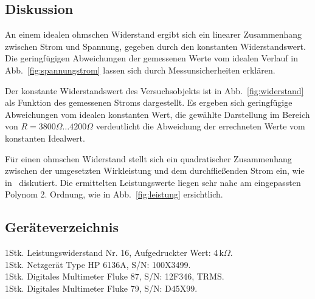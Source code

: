 \documentclass[12pt,a4paper,ngerman]{article}
\begin{document}



\subsection{Diskussion}
%
An einem idealen ohmschen Widerstand ergibt sich ein linearer Zusammenhang
zwischen Strom und Spannung, gegeben durch den konstanten Widerstandswert.
Die geringfügigen Abweichungen der gemessenen Werte vom idealen Verlauf in Abb.~\ref{fig:spannungstrom} lassen sich durch Messunsicherheiten erklären.

Der konstante Widerstandswert des Versuchsobjekts ist in Abb.~\ref{fig:widerstand} als Funktion des gemessenen Stroms dargestellt. Es ergeben sich geringfügige
Abweichungen vom idealen konstanten Wert, die gewählte Darstellung im Bereich von
$R=3800\Omega\dots4200\Omega$ verdeutlicht die Abweichung der errechneten Werte vom konstanten Idealwert.

Für einen ohmschen Widerstand stellt sich ein quadratischer Zusammenhang zwischen der umgesetzten Wirkleistung und dem durchfließenden Strom ein, wie in~\cite{Skript:ES1} diskutiert. Die ermittelten Leistungswerte liegen sehr nahe am eingepassten Polynom 2. Ordnung, wie in Abb.~\ref{fig:leistung} ersichtlich.

\subsection{Geräteverzeichnis}
%
1Stk. Leistungswiderstand Nr. 16, Aufgedruckter Wert: 4$\,$k$\Omega$.\\
1Stk. Netzgerät Type HP 6136A, S/N: 100X3499.\\
1Stk. Digitales Multimeter Fluke 87, S/N: 12F346, TRMS.\\
1Stk. Digitales Multimeter Fluke 79, S/N: D45X99.\\

\end{document}
